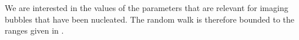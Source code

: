 
We are interested in the values of the parameters that are relevant for imaging bubbles that have been nucleated.
The random walk is therefore bounded to the ranges given in  .










